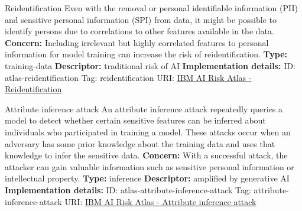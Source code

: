 \documentclass[a4paper,12pt]{article}
\begin{document}
\begin{definitionbox}{Reidentification}
Even with the removal or personal identifiable information (PII) and sensitive personal information (SPI) from data, it might be possible to identify persons due to correlations to other features available in the data.\newline\newline
\textbf{Concern: }Including irrelevant but highly correlated features to personal information for model training can increase the risk of reidentification.\newline\newline
\textbf{Type: }training-data\newline
\textbf{Descriptor: }traditional risk of AI \newline\newline
\textbf{Implementation details: } \newline
ID: atlas-reidentification \newline
Tag: reidentification \newline
URI:  \href{https://www.ibm.com/docs/en/watsonx/saas?topic=SSYOK8/wsj/ai-risk-atlas/reidentification.html}{IBM AI Risk Atlas - Reidentification}\newline
\end{definitionbox}
\begin{definitionbox}{Attribute inference attack}
An attribute inference attack repeatedly queries a model to detect whether certain sensitive features can be inferred about individuals who participated in training a model. These attacks occur when an adversary has some prior knowledge about the training data and uses that knowledge to infer the sensitive data.\newline\newline
\textbf{Concern: }With a successful attack, the attacker can gain valuable information such as sensitive personal information or intellectual property.\newline\newline
\textbf{Type: }inference\newline
\textbf{Descriptor: }amplified by generative AI \newline\newline
\textbf{Implementation details: } \newline
ID: atlas-attribute-inference-attack \newline
Tag: attribute-inference-attack \newline
URI:  \href{https://www.ibm.com/docs/en/watsonx/saas?topic=SSYOK8/wsj/ai-risk-atlas/attribute-inference-attack.html}{IBM AI Risk Atlas - Attribute inference attack}\newline
\end{definitionbox}
\end{document}
